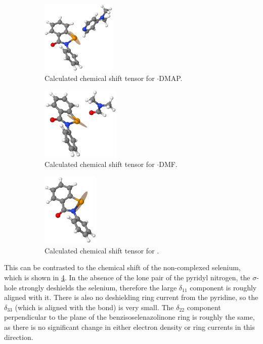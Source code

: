 \begin{refsection}
\begin{figure}
  \centering
  \begin{subfigure}{0.3\linewidth}
    \centering
    \includegraphics[height=3.5cm]{Figures/77se-tensor-ebs-dmap.png}
    \caption{Calculated chemical shift tensor for $ \cdot $DMAP.}\label{fig:77se-tensor-ebs-dmap}
  \end{subfigure}
  \begin{subfigure}{0.3\linewidth}
    \centering
    \includegraphics[height=3.5cm]{Figures/77se-tensor-ebs-dmf.png}
    \caption{Calculated chemical shift tensor for $ \cdot $DMF.}\label{fig:77se-tensor-ebs-dmf}
  \end{subfigure}
  \begin{subfigure}{0.3\linewidth}
    \centering
    \includegraphics[height=3.5cm]{Figures/77se-tensor-ebs.png}
    \caption{Calculated chemical shift tensor for .}\label{fig:77se-tensor-ebs}
  \end{subfigure}
  \caption[Calculated chemical shift tensors for ebselen derivatives.]{}
\end{figure}

This can be contrasted to the chemical shift of the non-complexed selen\-ium, which is shown in \cref{fig:77se-tensor-ebs}.
In the absence of the lone pair of the pyridyl nitrogen, the $ \sigma $-hole strongly deshields the selenium, therefore the large $\delta_{11}$ component is roughly aligned with it.
There is also no deshielding ring current from the pyridine, so the $\delta_{33}$ (which is aligned with the  bond) is very small.
The $\delta_{22}$ component perpendicular to the plane of the benzisoselenazolinone ring is roughly the same, as there is no significant change in either electron density or ring currents in this direction.


\end{refsection}
